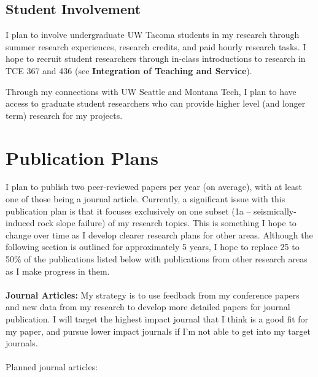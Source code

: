 \documentclass[10pt,letterpaper]{article}
\begin{document}
\subsection*{Student Involvement}
I plan to involve undergraduate UW Tacoma students in my research through summer research experiences, research credits, and paid hourly research tasks.
I hope to recruit student researchers through in-class introductions to research in TCE 367 and 436 (see \textbf{Integration of Teaching and Service}).

Through my connections with UW Seattle and Montana Tech, I plan to have access to graduate student researchers who can provide higher level (and longer term) research for my projects.

\section{Publication Plans}
I plan to publish two peer-reviewed papers per year (on average), with at least one of those being a journal article.
Currently, a significant issue with this publication plan is that it focuses exclusively on one subset (1a -- seismically-induced rock slope failure) of my research topics.
This is something I hope to change over time as I develop clearer research plans for other areas. 
Although the following section is outlined for approximately 5 years, I hope to replace 25 to 50\% of the publications listed below with publications from other research areas as I make progress in them.
\\
\\
\noindent \textbf{Journal Articles:} My strategy is to use feedback from my conference papers and new data from my research to develop more detailed papers for journal publication. 
I will target the highest impact journal that I think is a good fit for my paper, and pursue lower impact journals if I'm not able to get into my target journals.
\\
\\
\noindent Planned journal articles:
\end{document}
